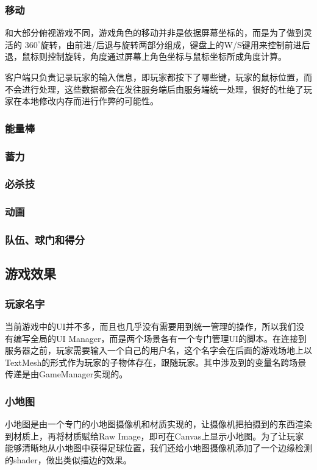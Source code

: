\documentclass[conference]{IEEEtran}
\begin{document}
\subsubsection{移动}
和大部分俯视游戏不同，游戏角色的移动并非是依据屏幕坐标的，而是为了做到灵活的 $360^\circ$旋转，由前进/后退与旋转两部分组成，键盘上的W/S键用来控制前进后退，鼠标则控制旋转，角度通过屏幕上角色坐标与鼠标坐标所成角度计算。

客户端只负责记录玩家的输入信息，即玩家都按下了哪些键，玩家的鼠标位置，而不会进行处理，这些数据都会在发往服务端后由服务端统一处理，很好的杜绝了玩家在本地修改内存而进行作弊的可能性。

\subsubsection{能量棒}
\subsubsection{蓄力}
\subsubsection{必杀技}
\subsubsection{动画}
\subsubsection{队伍、球门和得分}


\subsection{游戏效果}
\subsubsection{玩家名字}
当前游戏中的UI并不多，而且也几乎没有需要用到统一管理的操作，所以我们没有编写全局的UI Manager，而是两个场景各有一个专门管理UI的脚本。在连接到服务器之前，玩家需要输入一个自己的用户名，这个名字会在后面的游戏场地上以TextMesh的形式作为玩家的子物体存在，跟随玩家。其中涉及到的变量名跨场景传递是由GameManager实现的。

\subsubsection{小地图}
小地图是由一个专门的小地图摄像机和材质实现的，让摄像机把拍摄到的东西渲染到材质上，再将材质赋给Raw Image，即可在Canvas上显示小地图。为了让玩家能够清晰地从小地图中获得足球位置，我们还给小地图摄像机添加了一个边缘检测的shader，做出类似描边的效果。
\end{document}
